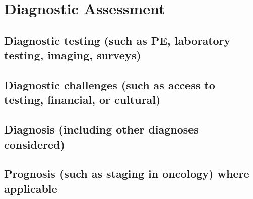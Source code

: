 \section{Diagnostic Assessment}
\subsection{Diagnostic testing (such as PE, laboratory testing, imaging, surveys)}
\subsection{Diagnostic challenges (such as access to testing, financial, or cultural)}
\subsection{Diagnosis (including other diagnoses considered)}
\subsection{Prognosis (such as staging in oncology) where applicable}